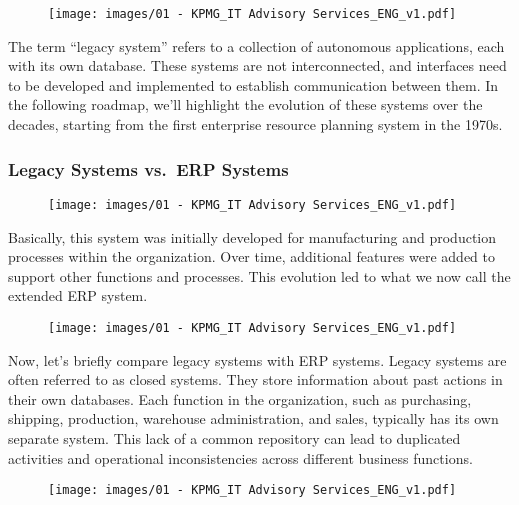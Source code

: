 \begin{figure}[!h]
  \centering
  \texttt{[image: images/01 - KPMG\_IT Advisory Services\_ENG\_v1.pdf]}
\end{figure}

The term ``legacy system'' refers to a collection of autonomous
applications, each with its own database. These systems are not
interconnected, and interfaces need to be developed and implemented to
establish communication between them. In the following roadmap, we'll
highlight the evolution of these systems over the decades, starting from
the first enterprise resource planning system in the 1970s.

\subsubsection{Legacy Systems vs.~ERP
  Systems}\label{legacy-systems-vs.-erp-systems}

\begin{figure}[!h]
  \centering
  \texttt{[image: images/01 - KPMG\_IT Advisory Services\_ENG\_v1.pdf]}
\end{figure}

Basically, this system was initially developed for manufacturing and
production processes within the organization. Over time, additional
features were added to support other functions and processes. This
evolution led to what we now call the extended ERP system.

\begin{figure}[!h]
  \centering
  \texttt{[image: images/01 - KPMG\_IT Advisory Services\_ENG\_v1.pdf]}
\end{figure}

Now, let's briefly compare legacy systems with ERP systems. Legacy
systems are often referred to as closed systems. They store information
about past actions in their own databases. Each function in the
organization, such as purchasing, shipping, production, warehouse
administration, and sales, typically has its own separate system. This
lack of a common repository can lead to duplicated activities and
operational inconsistencies across different business functions.

\begin{figure}[!h]
  \centering
  \texttt{[image: images/01 - KPMG\_IT Advisory Services\_ENG\_v1.pdf]}
\end{figure}

